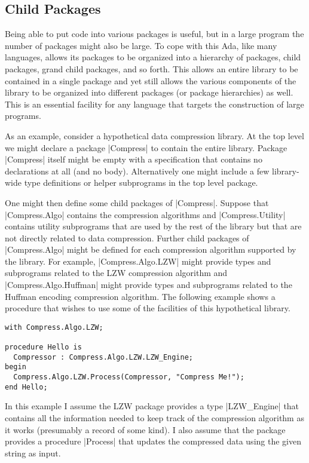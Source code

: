 \subsection{Child Packages}

Being able to put code into various packages is useful, but in a large program the number of
packages might also be large. To cope with this Ada, like many languages, allows its packages to
be organized into a hierarchy of packages, child packages, grand child packages, and so forth.
This allows an entire library to be contained in a single package and yet still allows the
various components of the library to be organized into different packages (or package
hierarchies) as well. This is an essential facility for any language that targets the
construction of large programs.

As an example, consider a hypothetical data compression library. At the top level we might
declare a package |Compress| to contain the entire library. Package |Compress| itself might be
empty with a specification that contains no declarations at all (and no body). Alternatively one
might include a few library-wide type definitions or helper subprograms in the top level
package.

One might then define some child packages of |Compress|. Suppose that |Compress.Algo| contains
the compression algorithms and |Compress.Utility| contains utility subprograms that are used by
the rest of the library but that are not directly related to data compression. Further child
packages of |Compress.Algo| might be defined for each compression algorithm supported by the
library. For example, |Compress.Algo.LZW| might provide types and subprograms related to the LZW
compression algorithm and |Compress.Algo.Huffman| might provide types and subprograms related to
the Huffman encoding compression algorithm. The following example shows a procedure that wishes
to use some of the facilities of this hypothetical library.

\begin{lstlisting}
with Compress.Algo.LZW;

procedure Hello is
  Compressor : Compress.Algo.LZW.LZW_Engine;
begin
  Compress.Algo.LZW.Process(Compressor, "Compress Me!");
end Hello;
\end{lstlisting}

In this example I assume the LZW package provides a type |LZW_Engine| that contains all the
information needed to keep track of the compression algorithm as it works (presumably a record
of some kind). I also assume that the package provides a procedure |Process| that updates the
compressed data using the given string as input.

